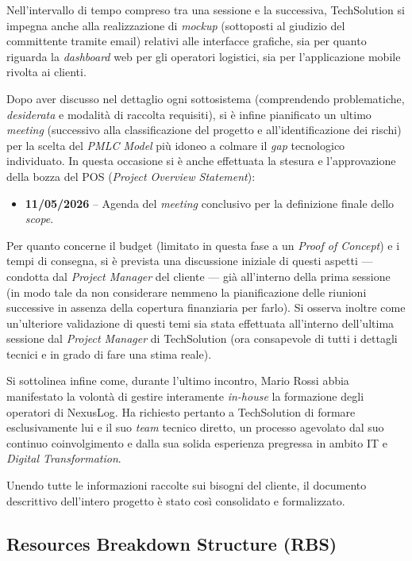 \documentclass[12pt, a4paper]{article}
\begin{document}
Nell'intervallo di tempo compreso tra una sessione e la successiva, TechSolution si impegna anche alla realizzazione di \textit{mockup} (sottoposti al giudizio del committente tramite email) relativi alle interfacce grafiche, sia per quanto riguarda la \textit{dashboard} web per gli operatori logistici, sia per l'applicazione mobile rivolta ai clienti.

Dopo aver discusso nel dettaglio ogni sottosistema (comprendendo problematiche, \textit{desiderata} e modalità di raccolta requisiti), si è infine pianificato un ultimo \textit{meeting} (successivo alla classificazione del progetto e all'identificazione dei rischi) per la scelta del \textit{PMLC Model} più idoneo a colmare il \textit{gap} tecnologico individuato. In questa occasione si è anche effettuata la stesura e l'approvazione della bozza del POS (\textit{Project Overview Statement}):
\begin{itemize}
    \item \textbf{11/05/2026} -- Agenda del \textit{meeting} conclusivo per la definizione finale dello \textit{scope}.
\end{itemize}

Per quanto concerne il budget (limitato in questa fase a un \textit{Proof of Concept}) e i tempi di consegna, si è prevista una discussione iniziale di questi aspetti — condotta dal \textit{Project Manager} del cliente — già all'interno della prima sessione (in modo tale da non considerare nemmeno la pianificazione delle riunioni successive in assenza della copertura finanziaria per farlo). Si osserva inoltre come un'ulteriore validazione di questi temi sia stata effettuata all'interno dell'ultima sessione dal \textit{Project Manager} di TechSolution (ora consapevole di tutti i dettagli tecnici e in grado di fare una stima reale).

Si sottolinea infine come, durante l'ultimo incontro, Mario Rossi abbia manifestato la volontà di gestire interamente \textit{in-house} la formazione degli operatori di NexusLog. Ha richiesto pertanto a TechSolution di formare esclusivamente lui e il suo \textit{team} tecnico diretto, un processo agevolato dal suo continuo coinvolgimento e dalla sua solida esperienza pregressa in ambito IT e \textit{Digital Transformation}.

Unendo tutte le informazioni raccolte sui bisogni del cliente, il documento descrittivo dell'intero progetto è stato così consolidato e formalizzato.
\subsection{Resources Breakdown Structure (RBS)}
\end{document}
